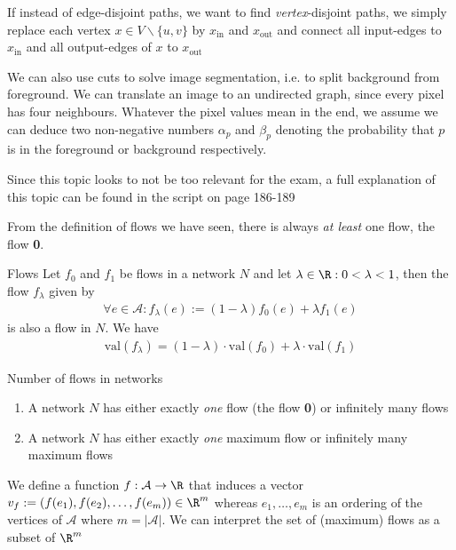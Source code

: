 If instead of edge-disjoint paths, we want to find \textit{vertex}-disjoint paths, we simply replace each vertex $x \in V\backslash\{u, v\}$ by $x_{\text{in}}$ and $x_{\text{out}}$ and connect all input-edges to $x_{\text{in}}$ and all output-edges of $x$ to $x_{\text{out}}$



We can also use cuts to solve image segmentation, i.e. to split background from foreground. We can translate an image to an undirected graph, since every pixel has four neighbours.
Whatever the pixel values mean in the end, we assume we can deduce two non-negative numbers $\alpha_p$ and $\beta_p$ denoting the probability that $p$ is in the foreground or background respectively.

Since this topic looks to not be too relevant for the exam, a full explanation of this topic can be found in the script on page 186-189



From the definition of flows we have seen, there is always \textit{at least} one flow, the flow \textbf{0}.

\begin{lemma}[]{Flows}
    Let $f_0$ and $f_1$ be flows in a network $N$ and let $\lambda \in \R : 0 < \lambda < 1$, then the flow $f_{\lambda}$ given by
    \begin{align*}
        \forall e \in \mathcal{A} : f_{\lambda}(e) := (1 - \lambda)f_0(e) + \lambda f_1(e)
    \end{align*}
    is also a flow in $N$. We have
    \begin{align*}
        \text{val}(f_{\lambda}) = (1 - \lambda) \cdot \text{val}(f_0) + \lambda \cdot \text{val}(f_1)
    \end{align*}
\end{lemma}

\begin{corollary}[]{Number of flows in networks}
    \begin{enumerate}[label=(\roman*)]
        \item A network $N$ has either exactly \textit{one} flow (the flow \textbf{0}) or infinitely many flows
        \item A network $N$ has either exactly \textit{one} maximum flow or infinitely many maximum flows
    \end{enumerate}
\end{corollary}


We define a function $f: \mathcal{A} \rightarrow \R$ that induces a vector $v_f := (f(e_1), f(e_2), \ldots, f(e_m)) \in \R^m$ whereas $e_1, \ldots, e_m$ is an ordering of the vertices of $\mathcal{A}$ where $m = |\mathcal{A}|$.
We can interpret the set of (maximum) flows as a subset of $\R^m$


